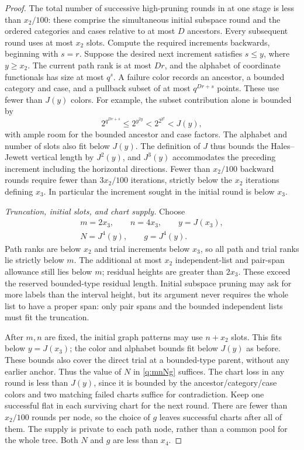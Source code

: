 \begin{proof}
The total number of successive high-pruning rounds in
 at one stage is
less than $x_2/100$: these comprise the simultaneous initial subspace
round and the ordered categories and cases relative to at most $D$
ancestors.  Every subsequent round uses at most $x_2$ slots.  Compute
the required increments backwards, beginning with $s=r$.  Suppose the
desired next increment satisfies $s\le y$, where $y\ge x_2$.
The current path rank is at most $Dr$, and the alphabet of coordinate
functionals has size at most $q^s$.  A failure color records an
ancestor, a bounded category and case, and a pullback subset of at most
$q^{Dr+s}$ points.  These use fewer than $J(y)$ colors.  For example,
the subset contribution alone is bounded by
\[
       2^{q^{Dr+s}}\le2^{y^{2y}}<2^{2^{y!}}<J(y),
\]
with ample room for the bounded ancestor and case factors.  The
alphabet and number of slots also fit below $J(y)$.  The definition
of $J$ thus bounds the Hales--Jewett vertical length by $J^2(y)$,
and $J^3(y)$ accommodates the preceding increment including the
horizontal directions.  Fewer than $x_2/100$ backward rounds require
fewer than $3x_2/100$ iterations, strictly below the $x_2$ iterations
defining $x_3$.  In particular the increment sought in the initial
round is below $x_3$.

\emph{Truncation, initial slots, and chart supply.}
Choose
\begin{equation}\label{q:mnNg}
 \begin{gathered}
       m=2x_3,\qquad n=4x_3,\qquad y=J(x_3),\\
       N=J^4(y),\qquad g=J^4(y).
 \end{gathered}
\end{equation}
Path ranks are below $x_2$ and trial increments below $x_3$, so all
path and trial ranks lie strictly below $m$.  The additional at most
$x_2$ independent-list and pair-span allowance still lies below $m$;
residual heights are greater than $2x_3$.  These exceed the reserved
bounded-type residual length.  Initial subspace pruning may ask for
more labels than the interval height, but its argument never requires
the whole list to have a proper span: only pair spans and the bounded
independent lists must fit the truncation.

After $m,n$ are fixed, the initial graph patterns may use $n+x_2$
slots.  This fits below $y=J(x_3)$; the color and alphabet bounds fit
below $J(y)$ as before.  These bounds also cover the direct trial at
a bounded-type parent, without any earlier anchor.  Thus the value
of $N$ in \eqref{q:mnNg} suffices.  The chart loss in any round is
less than $J(y)$, since it is bounded by the ancestor/category/case
colors and two matching failed charts suffice for contradiction.
Keep one successful flat in each surviving chart for the next round.
There are fewer than $x_2/100$ rounds per node, so the choice of $g$
leaves successful charts after all of them.  The supply is private
to each path node, rather than a common pool for the whole tree.
Both $N$ and $g$ are less than $x_4$.


\end{proof}
